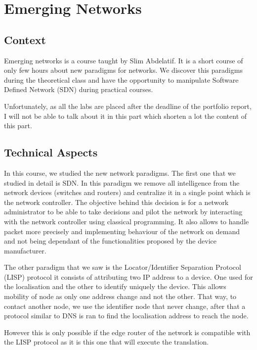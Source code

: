 \section{Emerging Networks}

\subsection{Context}

Emerging networks is a course taught by Slim Abdelatif. It is a short course of only few hours about new paradigms for networks. We discover this paradigms during the theoretical class and have the opportunity to manipulate Software Defined Network (SDN) during practical courses. 
\\\par

Unfortunately, as all the labs are placed after the deadline of the portfolio report, I will not be able to talk about it in this part which shorten a lot the content of this part.

\subsection{Technical Aspects}

In this course, we studied the new network paradigms. The first one that we studied in detail is SDN. In this paradigm we remove all intelligence from the network devices (switches and routers) and centralize it in a single point which is the network controller. The objective behind this decision is for a network administrator to be able to take decisions and pilot the network by interacting with the network controller using classical programming. It also allows to handle packet more precisely and implementing behaviour of the network on demand and not being dependant of the functionalities proposed by the device manufacturer.
\\\par

The other paradigm that we saw is the  Locator/Identifier Separation Protocol (LISP) protocol it consists of attributing two IP address to a device. One used for the localisation and the other to identify uniquely the device. This allows mobility of node as only one address change and not the other. That way, to contact another node, we use the identifier node that never change, after that a protocol similar to DNS is ran to find the localisation address to reach the node. 
\par
However this is only possible if the edge router of the network is compatible with the LISP protocol as it is this one that will execute the translation.

